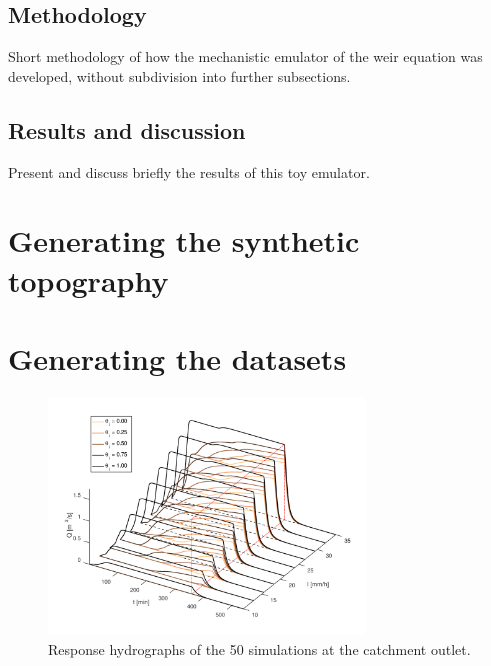 \subsection{Methodology}

Short methodology of how the mechanistic emulator of the weir equation was developed, without subdivision into further subsections.


\subsection{Results and discussion}

Present and discuss briefly the results of this toy emulator.


\section{Generating the synthetic topography}







\section{Generating the datasets}




\begin{figure}[htpb]
  \centering
  \includegraphics[width=0.75\textwidth]{Figures/hydrographs3d.png}
  \caption{Response hydrographs of the \num{50} simulations at the catchment outlet.}
  \label{fig:hydrographs3d}
\end{figure}


